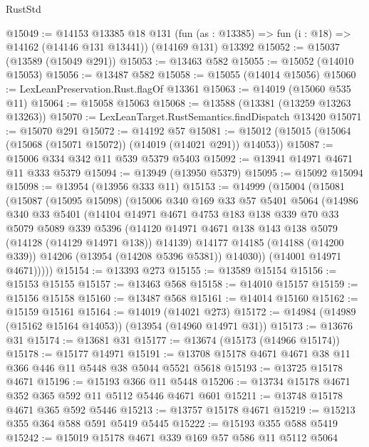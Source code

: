\begin{lexlean}{RustStd}
\begin{coremodule}
@15049 := @14153
    @13385
    @18
    @131
    (fun (as : @13385) => fun (i : @18) => @14162 (@14146 @131 @13441))
    (@14169 @131)
    @13392
@15052 := @15037 (@13589 (@15049 @291))
@15053 := @13463 @582
@15055 := @15052 (@14010 @15053)
@15056 := @13487 @582
@15058 := @15055 (@14014 @15056)
@15060 := LexLeanPreservation.Rust.flagOf @13361
@15063 := @14019 (@15060 @535 @11)
@15064 := @15058 @15063
@15068 := @13588 (@13381 (@13259 @13263 @13263))
@15070 := LexLeanTarget.RustSemantics.findDispatch @13420
@15071 := @15070 @291
@15072 := @14192 @57
@15081 := @15012 (@15015 (@15064 (@15068 (@15071 @15072)) (@14019 (@14021 @291)) @14053))
@15087 := @15006 @334 @342 @11 @539 @5379 @5403
@15092 := @13941 @14971 @4671 @11 @333 @5379
@15094 := @13949 (@13950 @5379)
@15095 := @15092 @15094
@15098 := @13954 (@13956 @333 @11)
@15153 := @14999
    (@15004
      (@15081
        (@15087
          (@15095 @15098)
          (@15006
            @340
            @169
            @33
            @57
            @5401
            @5064
            (@14986
              @340
              @33
              @5401
              (@14104
                @14971
                @4671
                @4753
                @183
                @138
                @339
                @70
                @33
                @5079
                @5089
                @339
                @5396
                (@14120 @14971 @4671 @138 @143 @138 @5079 (@14128 (@14129 @14971 @138)) @14139)
                @14177
                @14185
                (@14188 (@14200 @339))
                @14206
                (@13954 (@14208 @5396 @5381))
                @14030))
            (@14001 @14971 @4671)))))
@15154 := @13393 @273
@15155 := @13589 @15154
@15156 := @15153 @15155
@15157 := @13463 @568
@15158 := @14010 @15157
@15159 := @15156 @15158
@15160 := @13487 @568
@15161 := @14014 @15160
@15162 := @15159 @15161
@15164 := @14019 (@14021 @273)
@15172 := @14984 (@14989 (@15162 @15164 @14053)) (@13954 (@14960 @14971 @31))
@15173 := @13676 @31
@15174 := @13681 @31
@15177 := @13674 (@15173 (@14966 @15174))
@15178 := @15177 @14971
@15191 := @13708 @15178 @4671 @4671 @38 @11 @366 @446 @11 @5448 @38 @5044 @5521 @5618
@15193 := @13725 @15178 @4671
@15196 := @15193 @366 @11 @5448
@15206 := @13734 @15178 @4671 @352 @365 @592 @11 @5112 @5446 @4671 @601
@15211 := @13748 @15178 @4671 @365 @592 @5446
@15213 := @13757 @15178 @4671
@15219 := @15213 @355 @364 @588 @591 @5419 @5445
@15222 := @15193 @355 @588 @5419
@15242 := @15019
    @15178
    @4671
    @339
    @169
    @57
    @586
    @11
    @5112
    @5064

\end{coremodule}
\end{lexlean}
